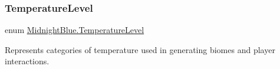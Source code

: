 \hypertarget{namespace_midnight_blue_a6ea6484178cbe707f25d1a0ed56db7ab}{}\label{namespace_midnight_blue_a6ea6484178cbe707f25d1a0ed56db7ab} 
\subsubsection{\texorpdfstring{Temperature\+Level}{TemperatureLevel}}
{\footnotesize\ttfamily enum \hyperlink{namespace_midnight_blue_a6ea6484178cbe707f25d1a0ed56db7ab}{Midnight\+Blue.\+Temperature\+Level}\hspace{0.3cm}{\ttfamily [strong]}}



Represents categories of temperature used in generating biomes and player interactions. 

